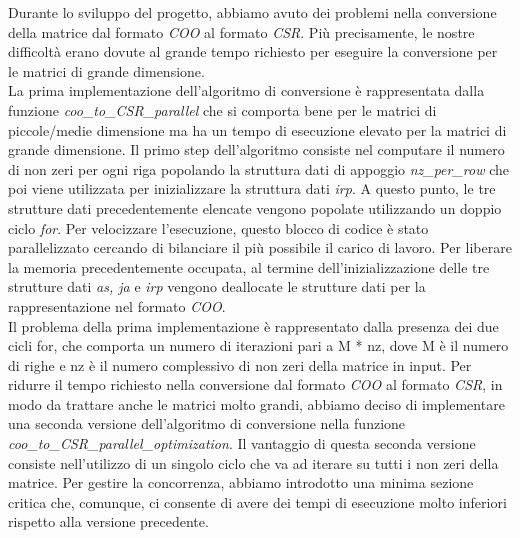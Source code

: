 \documentclass{article}
\begin{document}
Durante lo sviluppo del progetto, abbiamo avuto dei problemi nella conversione della matrice dal formato \textit{COO} al formato \textit{CSR}. Più precisamente, le nostre difficoltà erano dovute al grande tempo richiesto per eseguire la conversione per le matrici di grande dimensione.\\
La prima implementazione dell'algoritmo di conversione è rappresentata dalla funzione \textit{coo\_to\_CSR\_parallel} che si comporta bene per le matrici di piccole/medie dimensione ma ha un tempo di esecuzione elevato per la matrici di grande dimensione. Il primo step dell'algoritmo consiste nel computare il numero di non zeri per ogni riga popolando la struttura dati di appoggio \textit{nz\_per\_row} che poi viene utilizzata per inizializzare la struttura dati \textit{irp}. A questo punto, le tre strutture dati precedentemente elencate vengono popolate utilizzando un doppio ciclo \textit{for}. Per velocizzare l'esecuzione, questo blocco di codice è stato parallelizzato cercando di bilanciare il più possibile il carico di lavoro. Per liberare la memoria precedentemente occupata, al termine dell'inizializzazione delle tre strutture dati \textit{as, ja} e \textit{irp} vengono deallocate le strutture dati per la rappresentazione nel formato \textit{COO}. \\
Il problema della prima implementazione è rappresentato dalla presenza dei due cicli for, che comporta un numero di iterazioni pari a M * nz, dove M è il numero di righe e nz è il numero complessivo di non zeri della matrice in input. Per ridurre il tempo richiesto nella conversione dal formato \textit{COO} al formato \textit{CSR}, in modo da trattare anche le matrici molto grandi, abbiamo deciso di implementare una seconda versione dell'algoritmo di conversione nella funzione \textit{coo\_to\_CSR\_parallel\_optimization}. Il vantaggio di questa seconda versione consiste nell'utilizzo di un singolo ciclo che va ad iterare su tutti i non zeri della matrice. Per gestire la concorrenza, abbiamo introdotto una minima sezione critica che, comunque, ci consente di avere dei tempi di esecuzione molto inferiori rispetto alla versione precedente.
\end{document}
